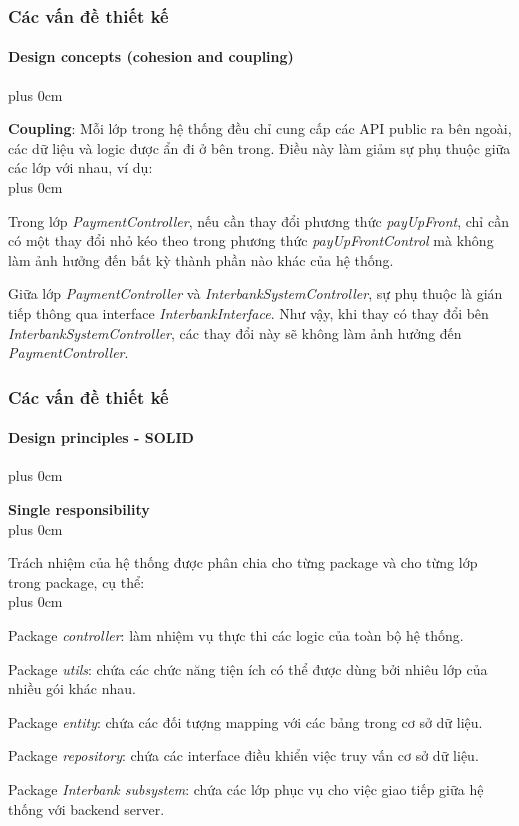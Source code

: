 \documentclass[11pt]{beamer}
\renewcommand{\raggedright}{\leftskip=0pt \rightskip=0pt plus 0cm}
\let\olditemize=\itemize
\renewenvironment{itemize}{\olditemize\raggedright}{\endlist}
\begin{document}
\begin{frame}[plain]
	\frametitle{Các vấn đề thiết kế}
	\framesubtitle{Design concepts (cohesion and coupling)}
	\begin{itemize}
		\item \textbf{Coupling}: Mỗi lớp trong hệ thống đều chỉ cung cấp các API public ra bên ngoài, các dữ liệu và logic được ẩn đi ở bên trong. Điều này làm giảm sự phụ thuộc giữa các lớp với nhau, ví dụ:\\[10pt]
		\begin{itemize}
			\item Trong lớp \textit{PaymentController}, nếu cần thay đổi phương thức \textit{payUpFront}, chỉ cần có một thay đổi nhỏ kéo theo trong phương thức \textit{payUpFrontControl} mà không làm ảnh hưởng đến bất kỳ thành phần nào khác của hệ thống.\\[5pt]
			\item Giữa lớp \textit{PaymentController} và \textit{InterbankSystemController}, sự phụ thuộc là gián tiếp thông qua interface \textit{InterbankInterface}. Như vậy, khi thay có thay đổi bên \textit{InterbankSystemController}, các thay đổi này sẽ không làm ảnh hưởng đến \textit{PaymentController}.
		\end{itemize}
	\end{itemize}
\end{frame}
\begin{frame}[plain]
	\frametitle{Các vấn đề thiết kế}
	\framesubtitle{Design principles - SOLID}
	\begin{itemize}
		\item \textbf{Single responsibility}\\[10pt]
		\begin{itemize}
			\item Trách nhiệm của hệ thống được phân chia cho từng package và cho từng lớp trong package, cụ thể:\\[8pt]
			\begin{itemize}
				\item Package \textit{controller}: làm nhiệm vụ thực thi các logic của toàn bộ hệ thống.
				\item Package \textit{utils}: chứa các chức năng tiện ích có thể được dùng bởi nhiêu lớp của nhiều gói khác nhau.
				\item Package \textit{entity}: chứa các đối tượng mapping với các bảng trong cơ sở dữ liệu.
				\item Package \textit{repository}: chứa các interface điều khiển việc truy vấn cơ sở dữ liệu. 
				\item Package \textit{Interbank subsystem}: chứa các lớp phục vụ cho việc giao tiếp giữa hệ thống với backend server.
			\end{itemize}
		\end{itemize}
	\end{itemize}
\end{frame}
\end{document}
